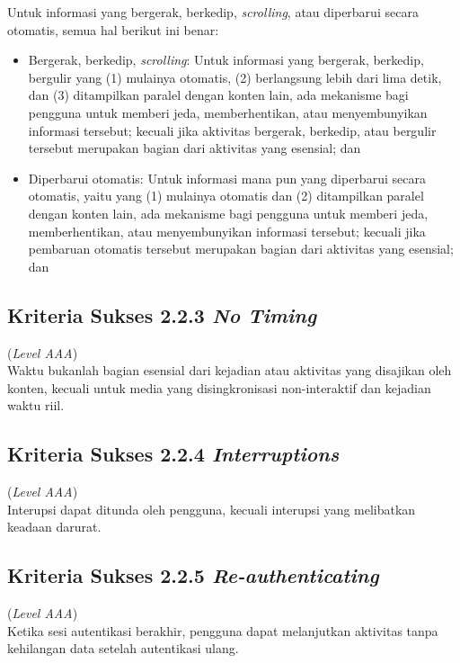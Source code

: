 Untuk informasi yang bergerak, berkedip, \textit{scrolling}, atau diperbarui secara otomatis, semua hal berikut ini benar:

\begin{itemize}
	\item Bergerak, berkedip, \textit{scrolling}: Untuk informasi yang bergerak, berkedip, bergulir yang (1) mulainya otomatis, (2) berlangsung lebih dari lima detik, dan (3) ditampilkan paralel dengan konten lain, ada mekanisme bagi pengguna untuk memberi jeda, memberhentikan, atau menyembunyikan informasi tersebut; kecuali jika aktivitas bergerak, berkedip, atau bergulir tersebut merupakan bagian dari aktivitas yang esensial; dan
	\item Diperbarui otomatis: Untuk informasi mana pun yang diperbarui secara otomatis, yaitu yang (1) mulainya otomatis dan (2) ditampilkan paralel dengan konten lain, ada mekanisme bagi pengguna untuk memberi jeda, memberhentikan, atau menyembunyikan informasi tersebut; kecuali jika pembaruan otomatis tersebut merupakan bagian dari aktivitas yang esensial; dan
\end{itemize}

\subsection{Kriteria Sukses 2.2.3 \textit{No Timing}}
\label{subsec:kriteria_2.2.3}
(\textit{Level AAA}) \\

Waktu bukanlah bagian esensial dari kejadian atau aktivitas yang disajikan oleh konten, kecuali untuk media yang disingkronisasi non-interaktif dan kejadian waktu riil.

\subsection{Kriteria Sukses 2.2.4 \textit{Interruptions}}
\label{subsec:kriteria_2.2.4}
(\textit{Level AAA}) \\

Interupsi dapat ditunda oleh pengguna, kecuali interupsi yang melibatkan keadaan darurat.

\subsection{Kriteria Sukses 2.2.5 \textit{Re-authenticating}}
\label{subsec:kriteria_2.2.5}
(\textit{Level AAA}) \\

Ketika sesi autentikasi berakhir, pengguna dapat melanjutkan aktivitas tanpa kehilangan data setelah autentikasi ulang.

